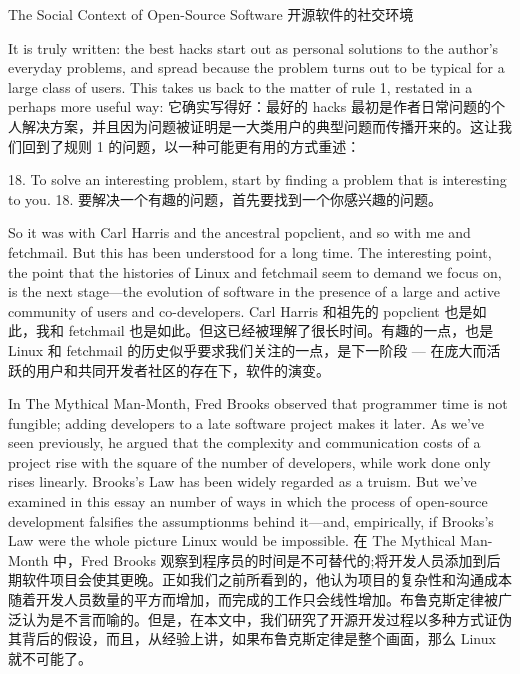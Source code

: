 \documentclass[a4paper,12pt,UTF8,twoside]{ctexbook}
\begin{document}
 The Social Context of Open-Source Software
开源软件的社交环境

It is truly written: the best hacks start out as personal solutions to the author's everyday problems, and spread because the problem turns out to be typical for a large class of users. This takes us back to the matter of rule 1, restated in a perhaps more useful way:
它确实写得好：最好的 hacks 最初是作者日常问题的个人解决方案，并且因为问题被证明是一大类用户的典型问题而传播开来的。这让我们回到了规则 1 的问题，以一种可能更有用的方式重述：

18. To solve an interesting problem, start by finding a problem that is interesting to you.
18. 要解决一个有趣的问题，首先要找到一个你感兴趣的问题。

So it was with Carl Harris and the ancestral popclient, and so with me and fetchmail. But this has been understood for a long time. The interesting point, the point that the histories of Linux and fetchmail seem to demand we focus on, is the next stage—the evolution of software in the presence of a large and active community of users and co-developers.
Carl Harris 和祖先的 popclient 也是如此，我和 fetchmail 也是如此。但这已经被理解了很长时间。有趣的一点，也是 Linux 和 fetchmail 的历史似乎要求我们关注的一点，是下一阶段 — 在庞大而活跃的用户和共同开发者社区的存在下，软件的演变。

In The Mythical Man-Month, Fred Brooks observed that programmer time is not fungible; adding developers to a late software project makes it later. As we've seen previously, he argued that the complexity and communication costs of a project rise with the square of the number of developers, while work done only rises linearly. Brooks's Law has been widely regarded as a truism. But we've examined in this essay an number of ways in which the process of open-source development falsifies the assumptionms behind it—and, empirically, if Brooks's Law were the whole picture Linux would be impossible.
在 The Mythical Man-Month 中，Fred Brooks 观察到程序员的时间是不可替代的;将开发人员添加到后期软件项目会使其更晚。正如我们之前所看到的，他认为项目的复杂性和沟通成本随着开发人员数量的平方而增加，而完成的工作只会线性增加。布鲁克斯定律被广泛认为是不言而喻的。但是，在本文中，我们研究了开源开发过程以多种方式证伪其背后的假设，而且，从经验上讲，如果布鲁克斯定律是整个画面，那么 Linux 就不可能了。
\end{document}
